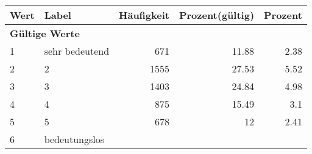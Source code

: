      \begin{longtable}{lXrrr}
     \toprule
     \textbf{Wert} & \textbf{Label} & \textbf{Häufigkeit} & \textbf{Prozent(gültig)} & \textbf{Prozent} \\
     \endhead
     \midrule
     \multicolumn{5}{l}{\textbf{Gültige Werte}}\\

     1 &
     \multicolumn{1}{X}{ sehr bedeutend   } &


       \num{671} &
       \num[round-mode=places,round-precision=2]{11,88} &
         \num[round-mode=places,round-precision=2]{2,38} \\

     2 &
     \multicolumn{1}{X}{ 2   } &


       \num{1555} &
       \num[round-mode=places,round-precision=2]{27,53} &
         \num[round-mode=places,round-precision=2]{5,52} \\

     3 &
     \multicolumn{1}{X}{ 3   } &


       \num{1403} &
       \num[round-mode=places,round-precision=2]{24,84} &
         \num[round-mode=places,round-precision=2]{4,98} \\

     4 &
     \multicolumn{1}{X}{ 4   } &


       \num{875} &
       \num[round-mode=places,round-precision=2]{15,49} &
         \num[round-mode=places,round-precision=2]{3,1} \\

     5 &
     \multicolumn{1}{X}{ 5   } &


       \num{678} &
       \num[round-mode=places,round-precision=2]{12} &
         \num[round-mode=places,round-precision=2]{2,41} \\

     6 &
     \multicolumn{1}{X}{ bedeutungslos   } &



\end{longtable}
